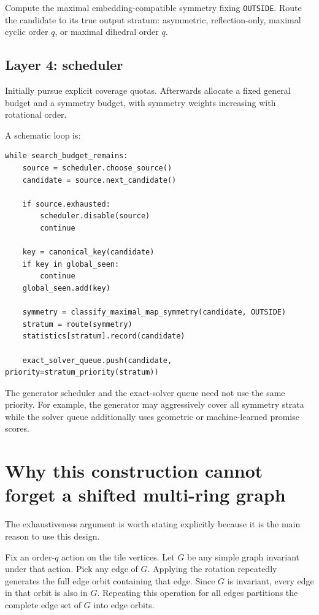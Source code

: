 \documentclass[11pt]{article}
\newcommand{\OUT}{\texttt{OUTSIDE}}
\begin{document}
Compute the maximal embedding-compatible symmetry fixing \OUT. Route the candidate to its true output stratum: asymmetric, reflection-only, maximal cyclic order \(q\), or maximal dihedral order \(q\).

\subsection*{Layer 4: scheduler}

Initially pursue explicit coverage quotas. Afterwards allocate a fixed general budget and a symmetry budget, with symmetry weights increasing with rotational order.

A schematic loop is:

\begin{lstlisting}
while search_budget_remains:
    source = scheduler.choose_source()
    candidate = source.next_candidate()

    if source.exhausted:
        scheduler.disable(source)
        continue

    key = canonical_key(candidate)
    if key in global_seen:
        continue
    global_seen.add(key)

    symmetry = classify_maximal_map_symmetry(candidate, OUTSIDE)
    stratum = route(symmetry)
    statistics[stratum].record(candidate)

    exact_solver_queue.push(candidate, priority=stratum_priority(stratum))
\end{lstlisting}

The generator scheduler and the exact-solver queue need not use the same priority. For example, the generator may aggressively cover all symmetry strata while the solver queue additionally uses geometric or machine-learned promise scores.

\section{Why this construction cannot forget a shifted multi-ring graph}

The exhaustiveness argument is worth stating explicitly because it is the main reason to use this design.

Fix an order-\(q\) action on the tile vertices. Let \(G\) be any simple graph invariant under that action. Pick any edge of \(G\). Applying the rotation repeatedly generates the full edge orbit containing that edge. Since \(G\) is invariant, every edge in that orbit is also in \(G\). Repeating this operation for all edges partitions the complete edge set of \(G\) into edge orbits.
\end{document}
